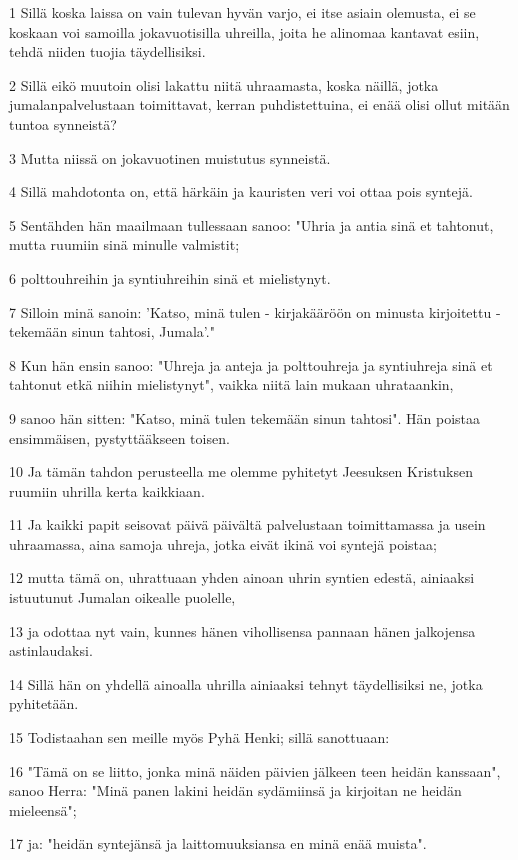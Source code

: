 \par 1 Sillä koska laissa on vain tulevan hyvän varjo, ei itse asiain olemusta, ei se koskaan voi samoilla jokavuotisilla uhreilla, joita he alinomaa kantavat esiin, tehdä niiden tuojia täydellisiksi.
\par 2 Sillä eikö muutoin olisi lakattu niitä uhraamasta, koska näillä, jotka jumalanpalvelustaan toimittavat, kerran puhdistettuina, ei enää olisi ollut mitään tuntoa synneistä?
\par 3 Mutta niissä on jokavuotinen muistutus synneistä.
\par 4 Sillä mahdotonta on, että härkäin ja kauristen veri voi ottaa pois syntejä.
\par 5 Sentähden hän maailmaan tullessaan sanoo: "Uhria ja antia sinä et tahtonut, mutta ruumiin sinä minulle valmistit;
\par 6 polttouhreihin ja syntiuhreihin sinä et mielistynyt.
\par 7 Silloin minä sanoin: 'Katso, minä tulen - kirjakääröön on minusta kirjoitettu - tekemään sinun tahtosi, Jumala'."
\par 8 Kun hän ensin sanoo: "Uhreja ja anteja ja polttouhreja ja syntiuhreja sinä et tahtonut etkä niihin mielistynyt", vaikka niitä lain mukaan uhrataankin,
\par 9 sanoo hän sitten: "Katso, minä tulen tekemään sinun tahtosi". Hän poistaa ensimmäisen, pystyttääkseen toisen.
\par 10 Ja tämän tahdon perusteella me olemme pyhitetyt Jeesuksen Kristuksen ruumiin uhrilla kerta kaikkiaan.
\par 11 Ja kaikki papit seisovat päivä päivältä palvelustaan toimittamassa ja usein uhraamassa, aina samoja uhreja, jotka eivät ikinä voi syntejä poistaa;
\par 12 mutta tämä on, uhrattuaan yhden ainoan uhrin syntien edestä, ainiaaksi istuutunut Jumalan oikealle puolelle,
\par 13 ja odottaa nyt vain, kunnes hänen vihollisensa pannaan hänen jalkojensa astinlaudaksi.
\par 14 Sillä hän on yhdellä ainoalla uhrilla ainiaaksi tehnyt täydellisiksi ne, jotka pyhitetään.
\par 15 Todistaahan sen meille myös Pyhä Henki; sillä sanottuaan:
\par 16 "Tämä on se liitto, jonka minä näiden päivien jälkeen teen heidän kanssaan", sanoo Herra: "Minä panen lakini heidän sydämiinsä ja kirjoitan ne heidän mieleensä";
\par 17 ja: "heidän syntejänsä ja laittomuuksiansa en minä enää muista".
